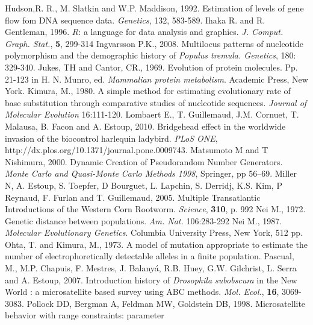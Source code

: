 \begin{thebibliography}{a}
 Hudson,R. R., M. Slatkin and W.P. Maddison, 1992. Estimation of levels of gene flow fom DNA sequence data. \emph{Genetics}, 132, 583-589.
Ihaka R. and R. Gentleman, 1996. $R$: a language for data analysis and graphics. \emph{J.  Comput. Graph. Stat.}, \textbf{5}, 299-314
 Ingvarsson P.K., 2008. Multilocus patterns of nucleotide polymorphism and the demographic history of \emph{Populus tremula. Genetics}, 180: 329-340.
Jukes, TH and Cantor, CR., 1969. Evolution of protein molecules. Pp. 21-123 in H. N. Munro, ed. \emph{Mammalian protein metabolism}. Academic Press, New York.
Kimura, M., 1980. A simple method for estimating evolutionary rate of base substitution through comparative studies of nucleotide sequences. \emph{Journal of Molecular Evolution} 16:111-120.
Lombaert E., T. Guillemaud, J.M. Cornuet, T. Malausa, B. Facon and A. Estoup, 2010.  Bridgehead effect in the worldwide invasion of the biocontrol harlequin ladybird. \emph{PLoS ONE}, http://dx.plos.org/10.1371/journal.pone.0009743.
 Matsumoto M and T Nishimura, 2000. Dynamic Creation of Pseudorandom Number Generators. \emph{Monte Carlo and Quasi-Monte Carlo Methods 1998}, Springer, pp 56--69.
 Miller N, A. Estoup, S. Toepfer, D Bourguet, L. Lapchin, S. Derridj, K.S. Kim, P Reynaud, F. Furlan and T. Guillemaud,  2005. Multiple Transatlantic Introductions of the Western Corn Rootworm. \emph{Science}, \textbf{310}, p. 992
 Nei M., 1972. Genetic distance between populations. \emph{Am. Nat.} 106:283-292
 Nei M., 1987. \emph{Molecular Evolutionary Genetics}. Columbia University Press, New York, 512 pp.
 Ohta, T. and Kimura, M.,
1973. A model of mutation appropriate to estimate the number of
electrophoretically detectable alleles in a finite population.
Pascual, M., M.P. Chapuis, F. Mestres, J. Balany\'a, R.B. Huey, G.W. Gilchrist, L. Serra and A. Estoup, 2007. Introduction history of \emph{Drosophila subobscura} in the New World : a microsatellite based survey using ABC methods. \emph{Mol. Ecol.}, \textbf{16}, 3069-3083.
Pollock DD, Bergman A, Feldman MW, Goldstein DB, 1998. Microsatellite behavior with range constraints: parameter

\end{thebibliography}
